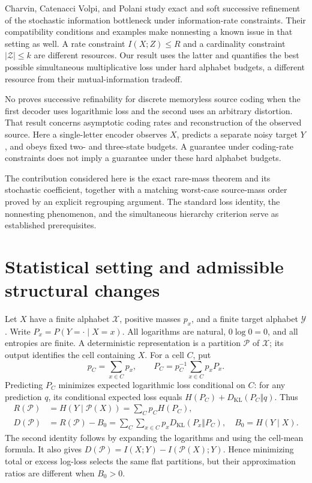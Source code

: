 \documentclass[11pt]{article}
\theoremstyle{remark}\newtheorem{remark}[theorem]{Remark}
\newcommand{\KL}{D_{\mathrm{KL}}}
\newcommand{\cP}{\mathcal P}
\begin{document}
Charvin, Catenacci Volpi, and Polani
\cite[Definition 5, Proposition 4, and Sections 2.3 and 3.2]{charvin2023} study exact and soft
successive refinement of the stochastic information bottleneck under
information-rate constraints. Their compatibility conditions and examples
make nonnesting a known issue in that setting as well. A rate constraint
$I(X;Z)\le R$ and a cardinality constraint $|\mathcal Z|\le k$ are
different resources. Our result uses the latter and quantifies the best
possible simultaneous multiplicative loss under hard alphabet budgets,
a different resource from their mutual-information tradeoff.

No \cite[Sections 2--3, Theorem 2]{no2019} proves successive refinability
for discrete memoryless source coding when the first decoder uses logarithmic
loss and the second uses an arbitrary distortion. That result concerns
asymptotic coding rates and reconstruction of the observed source. Here a
single-letter encoder observes $X$, predicts a separate noisy target $Y$,
and obeys fixed two- and three-state budgets. A guarantee under coding-rate
constraints does not imply a guarantee under these hard alphabet budgets.

The contribution considered here is the exact rare-mass theorem and its
stochastic coefficient, together with a matching worst-case source-mass
order proved by an explicit regrouping argument.
The standard loss identity, the nonnesting phenomenon, and the simultaneous
hierarchy criterion serve as established prerequisites.

\section{Statistical setting and admissible structural changes}
Let $X$ have a finite alphabet $\mathcal X$, positive masses $p_x$, and a
finite target alphabet $\mathcal Y$. Write $P_x=P(Y=\cdot\mid X=x)$.
All logarithms are natural, $0\log0=0$, and all entropies are finite.
A deterministic representation is a partition $\cP$ of $\mathcal X$;
its output identifies the cell containing $X$. For a cell $C$, put
\[
 p_C=\sum_{x\in C}p_x,\qquad
 P_C=p_C^{-1}\sum_{x\in C}p_xP_x.
\]
Predicting $P_C$ minimizes expected logarithmic loss conditional on $C$:
for any prediction $q$, its conditional expected loss equals
$H(P_C)+\KL(P_C\Vert q)$. Thus
\begin{align}
 R(\cP)&=H(Y\mid\cP(X))=\sum_C p_C H(P_C),\label{eq:risk}\\
 D(\cP)&=R(\cP)-B_0
   =\sum_C\sum_{x\in C}p_x\KL(P_x\Vert P_C),
 \quad B_0=H(Y\mid X).\label{eq:distortion}
\end{align}
The second identity follows by expanding the logarithms and using the
cell-mean formula. It also gives
$D(\cP)=I(X;Y)-I(\cP(X);Y)$. Hence minimizing total or excess
log-loss selects the same flat partitions, but their approximation ratios
are different when $B_0>0$.
\end{document}
